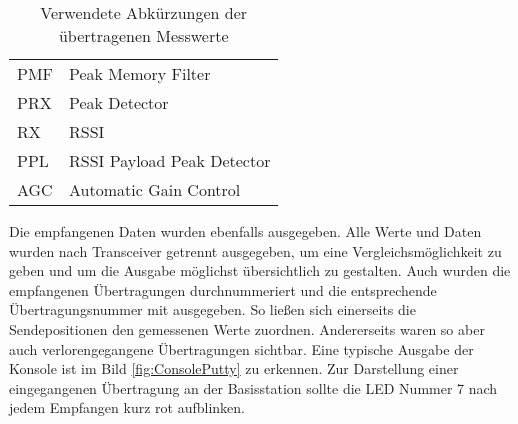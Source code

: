\begin{table}[tbh]
	\centering
	\begin{tabular}{ll}
		
		PMF			&Peak Memory Filter\\
		PRX			&Peak Detector\\
		RX			&\acf{RSSI}\\
		PPL			&RSSI Payload Peak Detector\\
		AGC			&Automatic Gain Control\\
		
	\end{tabular}
	\caption{Verwendete Abkürzungen der übertragenen Messwerte}
	\label{tab:RSSI}
\end{table}
Die empfangenen Daten wurden ebenfalls ausgegeben. 
Alle Werte und Daten wurden nach Transceiver getrennt ausgegeben, um eine Vergleichsmöglichkeit zu geben und um die Ausgabe möglichst übersichtlich zu gestalten.
Auch wurden die empfangenen Übertragungen durchnummeriert und die entsprechende Übertragungsnummer mit ausgegeben. So ließen sich einerseits die Sendepositionen den gemessenen Werte zuordnen. Andererseits waren so aber auch  verlorengegangene  Übertragungen sichtbar. Eine typische Ausgabe der Konsole ist im Bild \ref{fig:ConsolePutty} zu erkennen. Zur Darstellung einer eingegangenen Übertragung an der Basisstation sollte die LED Nummer 7 nach jedem Empfangen kurz rot aufblinken. %



